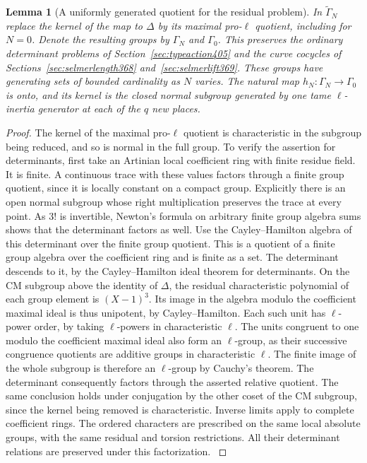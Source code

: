 \documentclass[a4paper,11pt]{article}
\newtheorem{lemma}[proposition]{Lemma}
\theoremstyle{definition}
\theoremstyle{remark}
\numberwithin{equation}{section}
\begin{document}
\begin{lemma}[A uniformly generated quotient for the residual problem]\leavevmode
\label{lem:relativepro407}
In \(\widetilde\Gamma_N\) replace the kernel of the map
to \(\Delta\) by its maximal pro-\(\ell\) quotient, including
for \(N=0\). Denote the resulting groups by \(\Gamma_N\)
and \(\Gamma_0\). This preserves the ordinary determinant
problems of Section~\ref{sec:typeaction405} and the curve
cocycles of Sections~\ref{sec:selmerlength368}
and~\ref{sec:selmerlift369}. These groups have generating
sets of bounded cardinality as \(N\) varies. The natural
map \(h_N:\Gamma_N\to\Gamma_0\) is onto, and its kernel is
the closed normal subgroup generated by one tame
\(\ell\)-inertia generator at each of the \(q\) new places.
\end{lemma}
\begin{proof}
The kernel of the maximal pro-\(\ell\) quotient is characteristic
in the subgroup being reduced, and so is normal in the full
group. To verify the assertion for determinants, first take
an Artinian local coefficient ring with finite residue field.
It is finite. A continuous trace with these values factors
through a finite group quotient, since it is locally constant
on a compact group. Explicitly there is an open normal subgroup
whose right multiplication preserves the trace at every point.
As \(3!\) is invertible, Newton's formula on arbitrary finite
group algebra sums shows that the determinant factors as well.
Use the Cayley--Hamilton algebra of this determinant over the
finite group quotient. This is a quotient of a finite group
algebra over the coefficient ring and is finite as a set.
The determinant descends to it, by the Cayley--Hamilton
ideal theorem for determinants. On the CM subgroup above
the identity of \(\Delta\), the residual characteristic
polynomial of each group element is \((X-1)^3\). Its image
in the algebra modulo the coefficient maximal ideal is thus
unipotent, by Cayley--Hamilton. Each such unit has
\(\ell\)-power order, by taking \(\ell\)-powers in
characteristic \(\ell\). The units congruent to one modulo
the coefficient maximal ideal also form an \(\ell\)-group,
as their successive congruence quotients are additive groups
in characteristic \(\ell\). The finite image of the whole
subgroup is therefore an \(\ell\)-group by Cauchy's theorem.
The determinant consequently factors through the asserted
relative quotient. The same conclusion holds under conjugation
by the other coset of the CM subgroup, since the kernel being
removed is characteristic. Inverse limits apply to complete
coefficient rings. The ordered characters are prescribed on
the same local absolute groups, with the same residual and
torsion restrictions. All their determinant relations are
preserved under this factorization. \cite{VIII-VI-chenevier364}


\end{proof}
\end{document}
